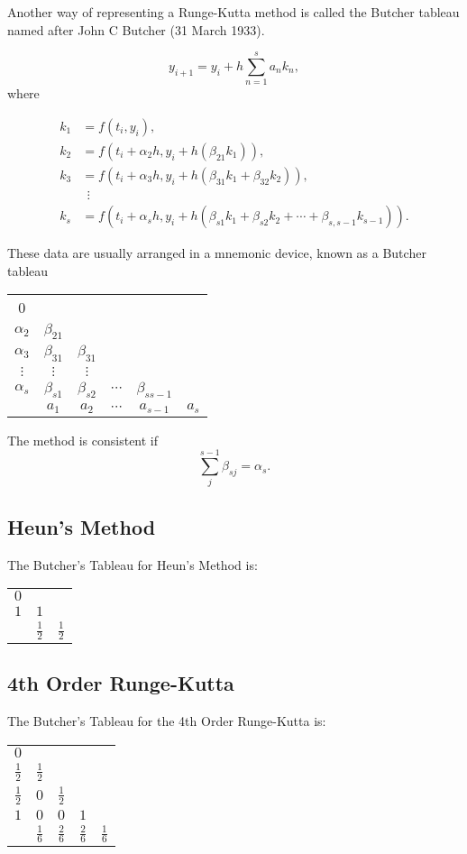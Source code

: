 Another way of representing a Runge-Kutta method is called the Butcher tableau named after John C Butcher (31 March 1933).

\[ y_{i+1}=y_{i}+h\sum_{n=1}^{s}a_{n}k_{n},\] 
where

\[ {\begin{aligned}k_{1}&=f(t_{i},y_{i}),\\k_{2}&=f(t_{i}+\alpha_{2}h,y_{i}+h(\beta_{21}k_{1})),\\k_{3}&=f(t_{i}+\alpha_{3}h,y_{i}+h(\beta_{31}k_{1}+\beta_{32}k_{2})),\\&\ \ \vdots \\k_{s}&=f(t_{i}+\alpha_{s}h,y_{i}+h(\beta_{s1}k_{1}+\beta_{s2}k_{2}+\cdots +\beta_{s,s-1}k_{s-1})).\end{aligned}}\] 

These data are usually arranged in a mnemonic device, known as a Butcher tableau
\begin{center}
 \begin{tabular}{c| c c c c c} 
 0&  &  & & & \\ 
 $\alpha_2$& $\beta_{21}$ &  & & & \\ 
 $\alpha_3$& $\beta_{31}$ & $\beta_{31}$ & & & \\ 
 $\vdots $& $\vdots$ & $\vdots$  & & & \\ 
 
 $\alpha_s$& $\beta_{s1}$ & $\beta_{s2}$ & $\cdots$& $\beta_{ss-1}$ & \\ 
 \hline
 & $a_{1}$  & $a_{2}$ & $\cdots$ &$a_{s-1}$ & $a_s$ \\ 
\end{tabular}
\end{center}
The method is consistent if 
\[\sum_{j}^{s-1} \beta_{sj}=\alpha_s.\]
\subsection{Heun's Method}
The Butcher's Tableau for Heun's Method is:
\begin{center}
 \begin{tabular}{c| c c} 
 $0$&    &   \\ 
 $1$& $1$ &   \\ 
 \hline
 & $\frac{1}{2}$  & $\frac{1}{2}$   \\ 
\end{tabular}
\end{center}
\subsection{4th Order Runge-Kutta}
The Butcher's Tableau for the 4th Order Runge-Kutta is:
\begin{center}
 \begin{tabular}{c| c c c c} 
 $0$&    &  & & \\ 
 $\frac{1}{2}$& $\frac{1}{2}$ &  & & \\ 
 $\frac{1}{2}$& $0$ & $\frac{1}{2}$ & &  \\ 
 $1 $& $0$ & $0$  &$1$ &  \\ 
 \hline
 & $\frac{1}{6}$  & $\frac{2}{6}$ & $\frac{2}{6}$ &$\frac{1}{6}$  \\ 
\end{tabular}
\end{center}

